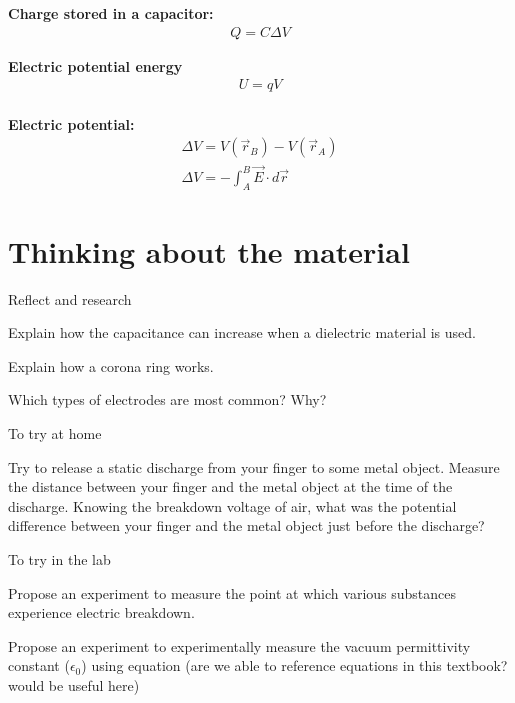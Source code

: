 \newpage
\begin{importantEquations}
\medskip
\begin{multicols}{2}
\textbf{Charge stored in a capacitor:}
\begin{align*}
Q = C\Delta V
\end{align*}

\textbf{Electric potential energy}
\begin{align*}
U=qV
\end{align*}
\columnbreak
\\
\textbf{Electric potential:}
\begin{align*}
\Delta V = V(\vec r_B)-V(\vec r_A)\\
\Delta V = -\int_{A}^{B}\vec E \cdot d\vec r
\end{align*}
\medskip
\end{multicols}
\end{importantEquations}


\newpage
\section{Thinking about the material}

\begin{chapteractivity}{Reflect and research}
{
\item Explain how the capacitance can increase when a dielectric material is used.
\item Explain how a corona ring works.
\item Which types of electrodes are most common? Why?
}
\end{chapteractivity}

\begin{chapteractivity}{To try at home}
{
\item Try to release a static discharge from your finger to some metal object. Measure the distance between your finger and the metal object at the time of the discharge. Knowing the breakdown voltage of air, what was the potential difference between your finger and the metal object just before the discharge?
}
\end{chapteractivity}

\begin{chapteractivity}{To try in the lab}
{
\item Propose an experiment to measure the point at which various substances experience electric breakdown.
\item Propose an experiment to experimentally measure the vacuum permittivity constant ($\epsilon_0$) using equation (are we able to reference equations in this textbook? would be useful here)
}
\end{chapteractivity}

